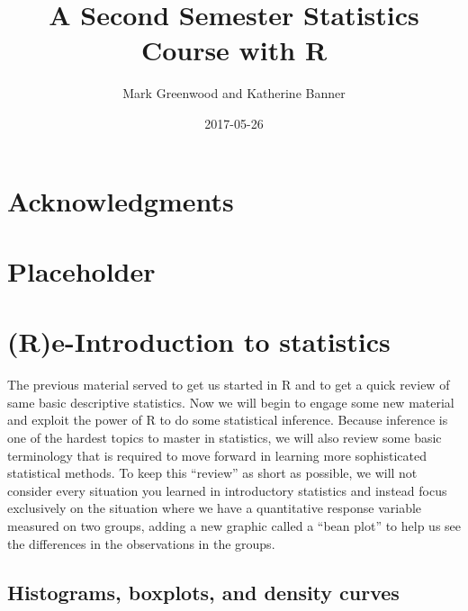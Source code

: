 \documentclass[]{book}
\title{A Second Semester Statistics Course with R}
\author{Mark Greenwood and Katherine Banner}
\date{2017-05-26}
\begin{document}
\maketitle

{
\setcounter{tocdepth}{1}
\tableofcontents
}
\chapter*{Acknowledgments}\label{acknowledgments}

\chapter{Placeholder}\label{placeholder}

\chapter{(R)e-Introduction to
statistics}\label{re-introduction-to-statistics}

The previous material served to get us started in R and to get a quick
review of same basic descriptive statistics. Now we will begin to engage
some new material and exploit the power of R to do some statistical
inference. Because inference is one of the hardest topics to master in
statistics, we will also review some basic terminology that is required
to move forward in learning more sophisticated statistical methods. To
keep this ``review'' as short as possible, we will not consider every
situation you learned in introductory statistics and instead focus
exclusively on the situation where we have a quantitative response
variable measured on two groups, adding a new graphic called a ``bean
plot'' to help us see the differences in the observations in the groups.

\section{Histograms, boxplots, and density curves}\label{section_2-1}
\end{document}
